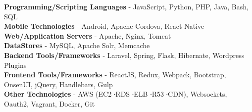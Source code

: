 \begin{footnotesize}
{\color{black}

\textbf{Programming/Scripting Languages} - JavaScript, Python, PHP, Java, Bash, SQL \\
\textbf{Mobile Technologies} - Android, Apache Cordova, React Native \\
\textbf{ Web/Application Servers} - Apache, Nginx, Tomcat \\
\textbf{DataStores} - MySQL, Apache Solr, Memcache \\
\textbf{Backend Tools/Frameworks} - Laravel, Spring, Flask, Hibernate, Wordpress Plugins \\
\textbf{Frontend Tools/Frameworks} - ReactJS,  Redux, Webpack, Bootstrap, OnsenUI, jQuery, Handlebars, Gulp \\
\textbf{Other Technologies} - AWS (EC2 ∙RDS ∙ELB ∙R53 ∙CDN), Websockets, Oauth2, Vagrant, Docker, Git

}
\end{footnotesize}
